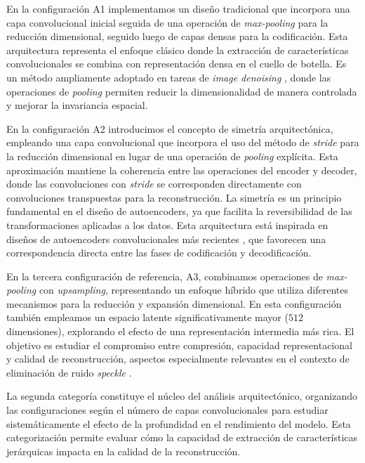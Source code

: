 En la configuración A1 implementamos un diseño tradicional que incorpora una capa convolucional inicial seguida de una operación de \emph{max-pooling} para la reducción dimensional, seguido luego de capas densas para la codificación. Esta arquitectura representa el enfoque clásico donde la extracción de características convolucionales se combina con representación densa en el cuello de botella. Es un método ampliamente adoptado en tareas de \emph{image denoising} \cite{vincent2008extracting}, donde las operaciones de \emph{pooling} permiten reducir la dimensionalidad de manera controlada y mejorar la invariancia espacial.

En la configuración A2 introducimos el concepto de simetría arquitectónica, empleando una capa convolucional que incorpora el uso del método de \emph{stride} para la reducción dimensional en lugar de una operación de \emph{pooling} explícita. Esta aproximación mantiene la coherencia entre las operaciones del encoder y decoder, donde las convoluciones con \emph{stride} se corresponden directamente con convoluciones transpuestas para la reconstrucción. La simetría es un principio fundamental en el diseño de autoencoders, ya que facilita la reversibilidad de las transformaciones aplicadas a los datos. Esta arquitectura está inspirada en diseños de autoencoders convolucionales más recientes \cite{masci2011stacked}, que favorecen una correspondencia directa entre las fases de codificación y decodificación.

En la tercera configuración de referencia, A3, combinamos operaciones de \emph{max-pooling} con \emph{upsampling}, representando un enfoque híbrido que utiliza diferentes mecanismos para la reducción y expansión dimensional. En esta configuración también empleamos un espacio latente significativamente mayor ($512$ dimensiones), explorando el efecto de una representación intermedia más rica. El objetivo es estudiar el compromiso entre compresión, capacidad representacional y calidad de reconstrucción, aspectos especialmente relevantes en el contexto de eliminación de ruido \emph{speckle} \cite{zhang2017beyond}.


La segunda categoría constituye el núcleo del análisis arquitectónico, organizando las configuraciones según el número de capas convolucionales para estudiar sistemáticamente el efecto de la profundidad en el rendimiento del modelo. Esta categorización permite evaluar cómo la capacidad de extracción de características jerárquicas impacta en la calidad de la reconstrucción.

